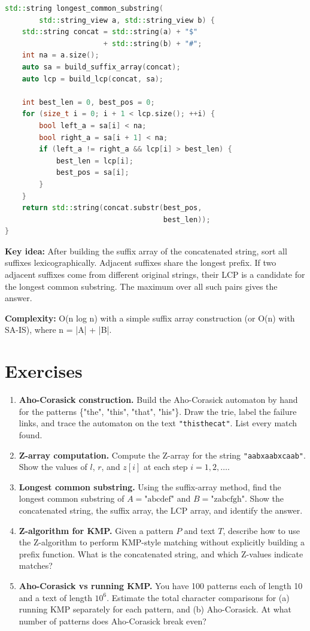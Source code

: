 \begin{lstlisting}[language=C++]
std::string longest_common_substring(
        std::string_view a, std::string_view b) {
    std::string concat = std::string(a) + "$"
                       + std::string(b) + "#";
    int na = a.size();
    auto sa = build_suffix_array(concat);
    auto lcp = build_lcp(concat, sa);

    int best_len = 0, best_pos = 0;
    for (size_t i = 0; i + 1 < lcp.size(); ++i) {
        bool left_a = sa[i] < na;
        bool right_a = sa[i + 1] < na;
        if (left_a != right_a && lcp[i] > best_len) {
            best_len = lcp[i];
            best_pos = sa[i];
        }
    }
    return std::string(concat.substr(best_pos,
                                     best_len));
}
\end{lstlisting}

\textbf{Key idea:} After building the suffix array of the concatenated string, sort all suffixes lexicographically. Adjacent suffixes share the longest prefix. If two adjacent suffixes come from different original strings, their LCP is a candidate for the longest common substring. The maximum over all such pairs gives the answer.

\textbf{Complexity:} O(n log n) with a simple suffix array construction (or O(n) with SA-IS), where n = |A| + |B|.

\section{Exercises}

\begin{enumerate}
\item \textbf{Aho-Corasick construction.} Build the Aho-Corasick automaton by hand for the patterns \{"the", "this", "that", "his"\}. Draw the trie, label the failure links, and trace the automaton on the text \texttt{"thisthecat"}. List every match found.

\item \textbf{Z-array computation.} Compute the Z-array for the string \texttt{"aabxaabxcaab"}. Show the values of $l$, $r$, and $z[i]$ at each step $i = 1, 2, \ldots$.

\item \textbf{Longest common substring.} Using the suffix-array method, find the longest common substring of $A = \text{"abcdef"}$ and $B = \text{"zabcfgh"}$. Show the concatenated string, the suffix array, the LCP array, and identify the answer.

\item \textbf{Z-algorithm for KMP.} Given a pattern $P$ and text $T$, describe how to use the Z-algorithm to perform KMP-style matching without explicitly building a prefix function. What is the concatenated string, and which Z-values indicate matches?

\item \textbf{Aho-Corasick vs running KMP.} You have 100 patterns each of length 10 and a text of length $10^{6}$. Estimate the total character comparisons for (a) running KMP separately for each pattern, and (b) Aho-Corasick. At what number of patterns does Aho-Corasick break even?
\end{enumerate}

